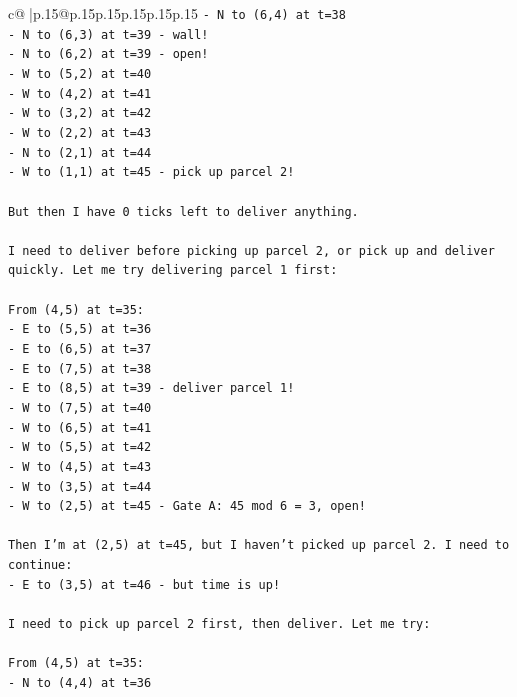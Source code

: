 \documentclass{article}
\begin{document}
{\begin{supertabular}{c@{$\;$}|p{.15\linewidth}@{}p{.15\linewidth}p{.15\linewidth}p{.15\linewidth}p{.15\linewidth}p{.15\linewidth}}
{{{\texttt{{-} N to (6,4) at t=38} \\
\texttt{{-} N to (6,3) at t=39 {-} wall!} \\
\texttt{{-} N to (6,2) at t=39 {-} open!} \\
\texttt{{-} W to (5,2) at t=40} \\
\texttt{{-} W to (4,2) at t=41} \\
\texttt{{-} W to (3,2) at t=42} \\
\texttt{{-} W to (2,2) at t=43} \\
\texttt{{-} N to (2,1) at t=44} \\
\texttt{{-} W to (1,1) at t=45 {-} pick up parcel 2!} \\
\\ 
\texttt{But then I have 0 ticks left to deliver anything.} \\
\\ 
\texttt{I need to deliver before picking up parcel 2, or pick up and deliver quickly. Let me try delivering parcel 1 first:} \\
\\ 
\texttt{From (4,5) at t=35:} \\
\texttt{{-} E to (5,5) at t=36} \\
\texttt{{-} E to (6,5) at t=37} \\
\texttt{{-} E to (7,5) at t=38} \\
\texttt{{-} E to (8,5) at t=39 {-} deliver parcel 1!} \\
\texttt{{-} W to (7,5) at t=40} \\
\texttt{{-} W to (6,5) at t=41} \\
\texttt{{-} W to (5,5) at t=42} \\
\texttt{{-} W to (4,5) at t=43} \\
\texttt{{-} W to (3,5) at t=44} \\
\texttt{{-} W to (2,5) at t=45 {-} Gate A: 45 mod 6 = 3, open!} \\
\\ 
\texttt{Then I'm at (2,5) at t=45, but I haven't picked up parcel 2. I need to continue:} \\
\texttt{{-} E to (3,5) at t=46 {-} but time is up!} \\
\\ 
\texttt{I need to pick up parcel 2 first, then deliver. Let me try:} \\
\\ 
\texttt{From (4,5) at t=35:} \\
\texttt{{-} N to (4,4) at t=36} \\
}}}
\end{supertabular}}
\end{document}
